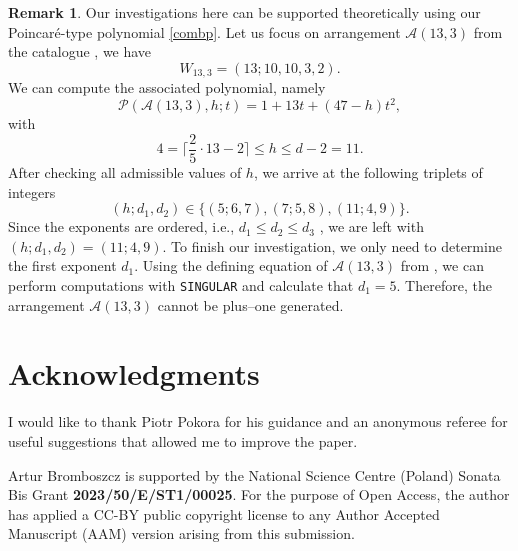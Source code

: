 \documentclass[12pt]{article}
\theoremstyle{plain}
\theoremstyle{definition}
\newtheorem{remark}[thm]{Remark}
\begin{document}
\begin{remark}
\label{pp2}
Our investigations here can be supported theoretically using our Poincar\'e-type polynomial \eqref{combp}. Let us focus on arrangement $\mathcal{A}(13,3)$ from the catalogue \cite{Cuntz}, we have
$$W_{13,3} = (13; 10, 10, 3, 2).$$
We can compute the associated polynomial, namely
$$\mathcal{P}(\mathcal{A}(13,3),h;t) = 1+ 13t + (47-h)t^2,$$
with
$$4=\bigg\lceil\frac{2}{5}\cdot 13 -2 \bigg\rceil \leq h \leq d-2 = 11.$$
After checking all admissible values of $h$, we arrive at the following triplets of integers
$$(h;d_1, d_2) \in \{(5;6,7),(7;5,8),(11;4,9)\}.$$
Since the exponents are ordered, i.e., $d_{1} \leq d_{2} \leq d_{3}$ , we are left with $(h; d_{1}, d_{2}) = (11; 4, 9)$. To finish our investigation, we only need to determine the first exponent $d_{1}$. Using the defining equation of $\mathcal{A}(13,3)$ from \cite{Cuntz}, we can perform computations with \verb}SINGULAR} and calculate that $d_1=5$. Therefore, the arrangement $\mathcal{A}(13,3)$ cannot be plus--one generated.
\end{remark}
\section*{Acknowledgments}
I would like to thank Piotr Pokora for his guidance and an anonymous referee for useful suggestions that allowed me to improve the paper.

Artur Bromboszcz is supported by the National Science Centre (Poland) Sonata Bis Grant  \textbf{2023/50/E/ST1/00025}. For the purpose of Open Access, the author has applied a CC-BY public copyright license to any Author Accepted Manuscript (AAM) version arising from this submission.
\end{document}
